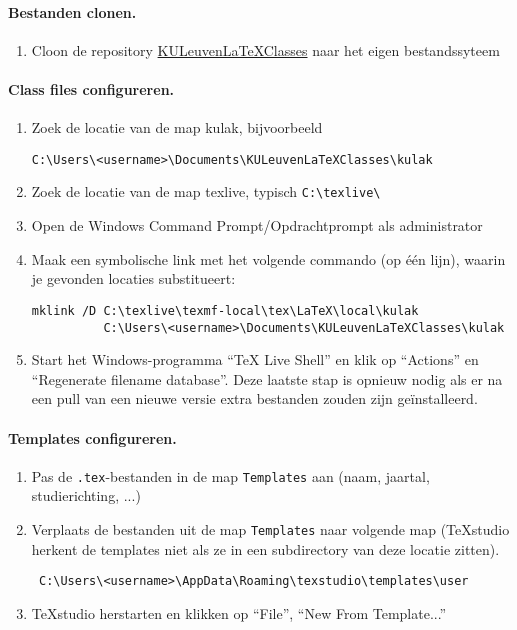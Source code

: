 \documentclass[kulak]{kulakarticle} %
\begin{document}
\paragraph{Bestanden clonen.}

\begin{enumerate}
\item Cloon de repository \href{https://github.com/srebry/KULeuvenLaTeXClasses}{KULeuvenLaTeXClasses} naar het eigen bestandssyteem
\end{enumerate}

\paragraph{Class files configureren.}
\begin{enumerate}[resume]
\item Zoek de locatie van de map kulak, bijvoorbeeld \begin{verbatim}
C:\Users\<username>\Documents\KULeuvenLaTeXClasses\kulak
\end{verbatim}
\item Zoek de locatie van de map texlive, typisch \verb+C:\texlive\+
\item Open de Windows Command Prompt/Opdrachtprompt als administrator
\item Maak een symbolische link met het volgende commando (op één lijn), waarin je gevonden locaties substitueert:
\begin{verbatim}
mklink /D C:\texlive\texmf-local\tex\LaTeX\local\kulak
          C:\Users\<username>\Documents\KULeuvenLaTeXClasses\kulak
\end{verbatim}			
\item Start het Windows-programma ``TeX Live Shell'' en klik op ``Actions'' en ``Regenerate filename database''. Deze laatste stap is opnieuw nodig als er na een pull van een nieuwe versie extra bestanden zouden zijn geïnstalleerd.
\end{enumerate}

\paragraph{Templates configureren.}
\begin{enumerate}
	\item Pas de \texttt{.tex}-bestanden in de map \texttt{Templates} aan (naam, jaartal, studierichting, ...)
	\item Verplaats de bestanden uit de map \texttt{Templates} naar volgende map (TeXstudio herkent de templates niet als ze in een subdirectory van deze locatie zitten).
	\begin{verbatim} C:\Users\<username>\AppData\Roaming\texstudio\templates\user
	\end{verbatim}
	\item TeXstudio herstarten en klikken op ``File'', ``New From Template...''
\end{enumerate}
\end{document}
